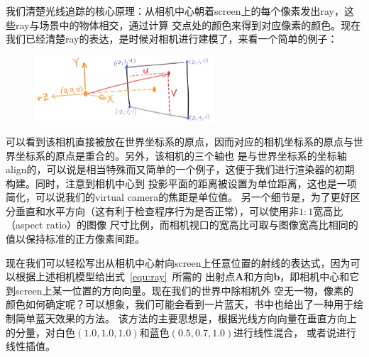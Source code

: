 \documentclass[12pt]{article}
\begin{document}
\indent{}我们清楚光线追踪的核心原理：从相机中心朝着screen上的每个像素发出ray，这些ray与场景中的物体相交，通过计算
交点处的颜色来得到对应像素的颜色。现在我们已经清楚ray的表达，是时候对相机进行建模了，来看一个简单的例子：
\begin{figure}[h]
\centering
\includegraphics[width=0.6\textwidth]{./imgs/fig-1.03-cam-geom.jpg}
\end{figure}

\indent{}可以看到该相机直接被放在世界坐标系的原点，因而对应的相机坐标系的原点与世界坐标系的原点是重合的。另外，该相机的三个轴也
是与世界坐标系的坐标轴align的，可以说是相当特殊而又简单的一个例子，这便于我们进行渲染器的初期构建。同时，注意到相机中心到
投影平面的距离被设置为单位距离，这也是一项简化，可以说我们的virtual camera的焦距是单位值。
另一个细节是，为了更好区分垂直和水平方向（这有利于检查程序行为是否正常），可以使用非$1:1$宽高比（aspect ratio）的图像
尺寸比例，而相机视口的宽高比可取与图像宽高比相同的值以保持标准的正方像素间距。

\indent{}现在我们可以轻松写出从相机中心射向screen上任意位置的射线的表达式，因为可以根据上述相机模型给出式~\ref{equ:ray}~所需的
出射点$\mathbf{A}$和方向$\mathbf{b}$，即相机中心和它到screen上某一位置的方向向量。现在我们的世界中除相机外
空无一物，像素的颜色如何确定呢？可以想象，我们可能会看到一片蓝天，书中也给出了一种用于绘制简单蓝天效果的方法。
该方法的主要思想是，根据光线方向向量在垂直方向上的分量，对白色$(1.0,1.0,1.0)$和蓝色$(0.5,0.7,1.0)$进行线性混合，
或者说进行线性插值。
\end{document}
